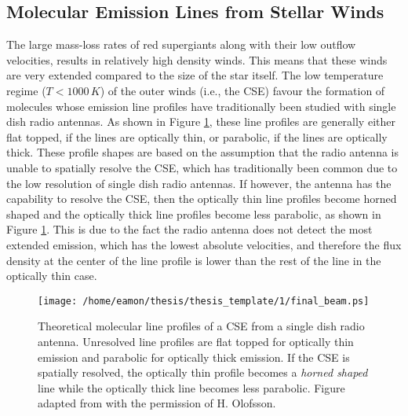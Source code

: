 \subsection{Molecular Emission Lines from Stellar Winds}\label{sec:1.8.5}
The large mass-loss rates of red supergiants along with their low outflow velocities, results in relatively high density winds. This means that these winds are very extended compared to the size of the star itself. The low temperature regime ($T< 1000\,K$) of the outer winds (i.e., the CSE) favour the formation of molecules whose emission line profiles have traditionally been studied with single dish radio antennas. As shown in Figure \ref{fig:1.8.5}, these line profiles are generally either flat topped, if the lines are optically thin, or parabolic, if the lines are optically thick. These profile shapes are based on the assumption that the radio antenna is unable to spatially resolve the CSE, which has traditionally been common due to the low resolution of single dish radio antennas. If however, the antenna has the capability to resolve the CSE, then the optically thin line profiles become horned shaped and the optically thick line profiles become less parabolic, as shown in Figure \ref{fig:1.8.5}. This is due to the fact the radio antenna does not detect the most extended emission, which has the lowest absolute velocities, and therefore the flux density at the center of the line profile is lower than the rest of the line in the optically thin case.

\begin{figure}[hbt!]
\centering 
          \texttt{[image: /home/eamon/thesis/thesis\_template/1/final\_beam.ps]}
\caption[Theoretical molecular line profiles]{Theoretical molecular line profiles of a CSE from a single dish radio antenna. Unresolved line profiles are flat topped for optically thin emission and parabolic for optically thick emission. If the CSE is spatially resolved, the optically thin profile becomes a \textit{horned shaped} line while the optically thick line becomes less parabolic. Figure adapted from \cite{dalgarno_1987} with the permission of H. Olofsson.}
\label{fig:1.8.5}
\end{figure}

